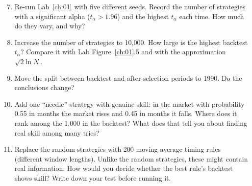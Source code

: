 \begin{enumerate}
  \setcounter{enumi}{6}
  \item Re-run Lab~\ref{ch:01} with five different seeds. Record the number of strategies with a significant alpha ($t_\alpha > 1.96$) and the highest $t_\alpha$ each time. How much do they vary, and why?
  \item Increase the number of strategies to 10,000. How large is the highest backtest $t_\alpha$? Compare it with Lab Figure~\ref{ch:01}.5 and with the approximation $\sqrt{2 \ln N}$.
  \item Move the split between backtest and after-selection periods to 1990. Do the conclusions change?
  \item Add one ``needle'' strategy with genuine skill: in the market with probability 0.55 in months the market rises and 0.45 in months it falls. Where does it rank among the 1,000 in the backtest? What does that tell you about finding real skill among many tries?
  \item Replace the random strategies with 200 moving-average timing rules (different window lengths). Unlike the random strategies, these might contain real information. How would you decide whether the best rule's backtest shows skill? Write down your test before running it.
\end{enumerate}
